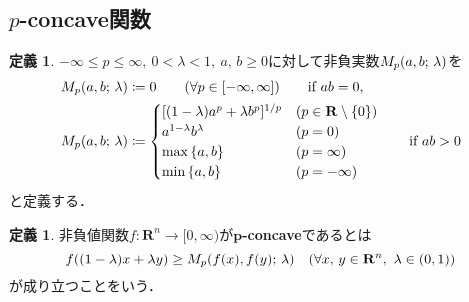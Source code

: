 \documentclass[a4j]{ltjsarticle}
\newcommand{\Rset}{\mathbf{R}}
\newcommand{\1}{\bm{1}}
\newcommand{\M}[4]{M_{#1}\qty(#2,#3;\,#4)}
\numberwithin{equation}{section}
\theoremstyle{definition}
\newtheorem{dfn}[thm]{定義}
\begin{document}
\subsection{\texorpdfstring{$p$}{TEXT}-concave関数}
\begin{dfn}
    $-\infty\leq p\leq \infty,\ 0<\lambda<1,\ a,\,b\geq0$に対して非負実数$\M{p}{a}{b}{\lambda}$を
    \begin{align}
        \M{p}{a}{b}{\lambda}&\coloneqq 0\quad\quad(\forall p\in [-\infty,\infty]) \quad\quad \text{if $ab=0$},\\
        \M{p}{a}{b}{\lambda}&\coloneqq \begin{cases}
            [(1-\lambda)a^p+\lambda b^p]^{1/p} & (p\in \Rset\setminus\qty{0})\\
            a^{1-\lambda}b^\lambda & (p=0)\\
            \max\qty{a,b} & (p=\infty)\\
            \min\qty{a,b} & (p=-\infty)
        \end{cases}\quad\quad \text{if $ab>0$}
    \end{align}
    と定義する．
\end{dfn}
\begin{dfn}
    非負値関数$f\colon \Rset^n\to[0,\infty)$が$\bm{p}$\textbf{-concave}であるとは
    \begin{equation}
        f((1-\lambda)x+\lambda y)\geq \M{p}{f(x)}{f(y)}{\lambda}\quad (\forall x,\,y\in\Rset^n,\ \lambda\in(0,1))
    \end{equation}
    が成り立つことをいう．
\end{dfn}
\end{document}
